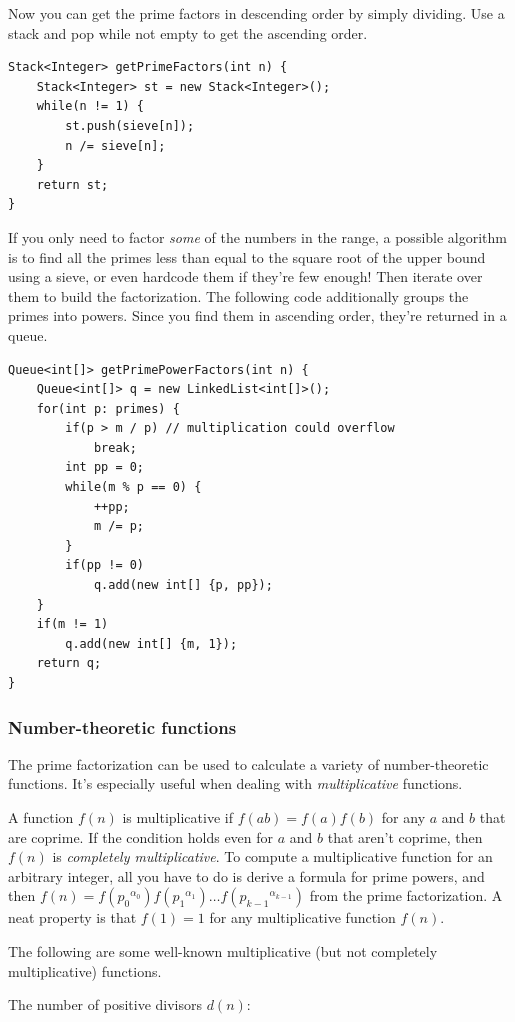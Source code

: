 \documentclass[a4paper,12pt]{article}
\begin{document}
\noindent Now you can get the prime factors in descending order by simply dividing. Use a stack and pop while not empty to get the ascending order.

\begin{lstlisting}
Stack<Integer> getPrimeFactors(int n) {
	Stack<Integer> st = new Stack<Integer>();
	while(n != 1) {
		st.push(sieve[n]);
		n /= sieve[n];
	}
	return st;
}
\end{lstlisting}

\noindent If you only need to factor {\em some} of the numbers in the range, a possible algorithm is to find all the primes less than equal to the square root of the upper bound using a sieve, or even hardcode them if they're few enough! Then iterate over them to build the factorization. The following code additionally groups the primes into powers. Since you find them in ascending order, they're returned in a queue.

\begin{lstlisting}
Queue<int[]> getPrimePowerFactors(int n) {
	Queue<int[]> q = new LinkedList<int[]>();
	for(int p: primes) {
		if(p > m / p) // multiplication could overflow
			break;
		int pp = 0;
		while(m % p == 0) {
			++pp;
			m /= p;
		}
		if(pp != 0)
			q.add(new int[] {p, pp});
	}
	if(m != 1)
		q.add(new int[] {m, 1});
	return q;
}
\end{lstlisting}

\subsubsection{Number-theoretic functions}

The prime factorization can be used to calculate a variety of number-theoretic functions. It's especially useful when dealing with {\em multiplicative} functions.

A function $f(n)$ is multiplicative if $f(ab)=f(a)f(b)$ for any $a$ and $b$ that are coprime. If the condition holds even for $a$ and $b$ that aren't coprime, then $f(n)$ is {\em completely multiplicative}. To compute a multiplicative function for an arbitrary integer, all you have to do is derive a formula for prime powers, and then $f(n)=f({p_0}^{\alpha_0})f({p_1}^{\alpha_1})\ldots f({p_{k-1}}^{\alpha_{k-1}})$ from the prime factorization. A neat property is that $f(1)=1$ for any multiplicative function $f(n)$. 

The following are some well-known multiplicative (but not completely multiplicative) functions.

The number of positive divisors $d(n)$:
\end{document}
